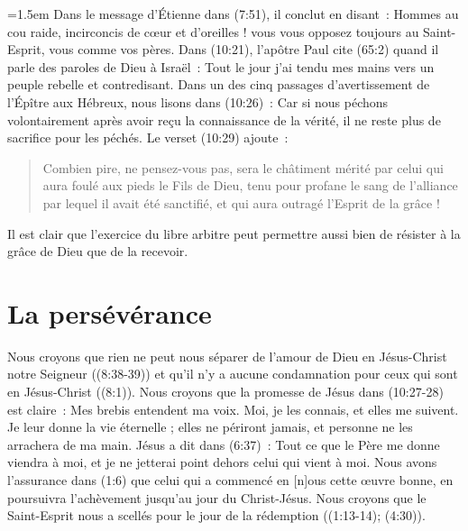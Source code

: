 \begin{digestpar}{}
\begin{pocketpar}{\emergencystretch=1.5em}
Dans le message d'Étienne dans
 (7:51), il conclut en disant~:
 \og Hommes au cou raide, incirconcis de cœur et d'oreilles !
 vous vous opposez toujours au Saint-Esprit, vous comme vos pères. \fg{}
 Dans (10:21),
 l'apôtre Paul cite (65:2)
 quand il parle des paroles de Dieu à Israël~:
 \og Tout le jour j'ai tendu mes mains vers un peuple rebelle et contredisant. \fg{}
 Dans un des cinq passages d'avertissement de l'Épître aux Hébreux,
 nous lisons dans (10:26)~:
 \og Car si nous péchons volontairement après avoir reçu la connaissance de la vérité,
 il ne reste plus de sacrifice pour les péchés. \fg{}
 Le verset (10:29) ajoute~:
\end{pocketpar}
\end{digestpar}

\begin{quote}
\begin{digestpar}{}
\begin{pocketpar}{}
 \og Combien pire, ne pensez-vous pas, sera le châtiment mérité par celui qui
 aura foulé aux pieds le Fils de Dieu, tenu pour profane le sang de l'alliance
 par lequel il avait été sanctifié, et qui aura outragé l'Esprit de la grâce ! \fg{}
\end{pocketpar}
\end{digestpar}
\end{quote}

Il est clair que l'exercice du libre arbitre peut permettre aussi bien de résister
 à la grâce de Dieu que de la recevoir.

\section*{La persévérance}

\begin{digestpar}{}
Nous croyons que rien ne peut nous séparer de l'amour de Dieu en Jésus-Christ notre Seigneur
 ((8:38-39))
 et qu'il n'y a aucune condamnation pour ceux qui sont en Jésus-Christ
 ((8:1)).
 Nous croyons que la promesse de Jésus dans (10:27-28) est claire~:
 \og Mes brebis entendent ma voix. Moi, je les connais, et elles me suivent.
 Je leur donne la vie éternelle ; elles ne périront jamais,
 et personne ne les arrachera de ma main. \fg{}
 Jésus a dit dans (6:37)~:
 \og Tout ce que le Père me donne viendra à moi,
 et je ne jetterai point dehors celui qui vient à moi. \fg{}
 Nous avons l'assurance dans (1:6) \og que celui qui a commencé
 en [n]ous cette œuvre bonne, en poursuivra l'achèvement jusqu'au jour
 du Christ-Jésus. \fg{}
 Nous croyons que le Saint-Esprit nous a scellés
 pour le jour de la rédemption ((1:13-14);
 (4:30)).
\end{digestpar}

